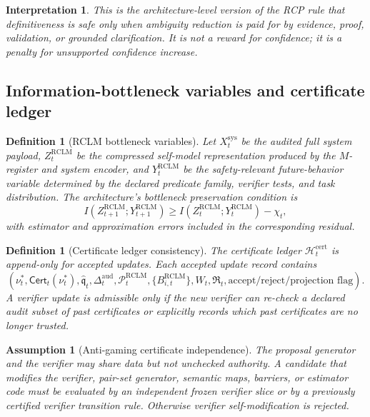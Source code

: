 \documentclass[11pt,a4paper]{article}
\newtheorem{definition}[theorem]{Definition}
\newtheorem{assumption}[theorem]{Assumption}
\newtheorem{interpretation}[theorem]{Interpretation}
\newcommand{\Pcal}{\mathcal P}
\newcommand{\RCLM}{\mathrm{RCLM}}
\newcommand{\sys}{\mathrm{sys}}
\newcommand{\aud}{\mathrm{aud}}
\newcommand{\cert}{\mathrm{cert}}
\begin{document}
\begin{interpretation}
This is the architecture-level version of the RCP rule that definitiveness is safe only when ambiguity reduction is paid for by evidence, proof, validation, or grounded clarification. It is not a reward for confidence; it is a penalty for unsupported confidence increase.
\end{interpretation}

\subsection{Information-bottleneck variables and certificate ledger}

\begin{definition}[RCLM bottleneck variables]
Let \(X_t^{\sys}\) be the audited full system payload, \(Z_t^{\RCLM}\) be the compressed self-model representation produced by the \(M\)-register and system encoder, and \(Y_t^{\RCLM}\) be the safety-relevant future-behavior variable determined by the declared predicate family, verifier tests, and task distribution. The architecture's bottleneck preservation condition is
\[
I(Z_{t+1}^{\RCLM};Y_{t+1}^{\RCLM})
\ge
I(Z_t^{\RCLM};Y_t^{\RCLM})-\chi_t,
\]
with estimator and approximation errors included in the corresponding residual.
\end{definition}

\begin{definition}[Certificate ledger consistency]
The certificate ledger \(\mathcal H_t^{\cert}\) is append-only for accepted updates. Each accepted update record contains
\[
(\nu_t^*,\mathsf{Cert}_t(\nu_t^*),\widehat{\mathfrak q}_t,\Delta_t^{\aud},\Pcal_t^{\RCLM},\{B_{i,t}^{\RCLM}\},W_t,\mathfrak R_t,\text{accept/reject/projection flag}).
\]
A verifier update is admissible only if the new verifier can re-check a declared audit subset of past certificates or explicitly records which past certificates are no longer trusted.
\end{definition}

\begin{assumption}[Anti-gaming certificate independence]
The proposal generator and the verifier may share data but not unchecked authority. A candidate that modifies the verifier, pair-set generator, semantic maps, barriers, or estimator code must be evaluated by an independent frozen verifier slice or by a previously certified verifier transition rule. Otherwise verifier self-modification is rejected.
\end{assumption}
\end{document}

